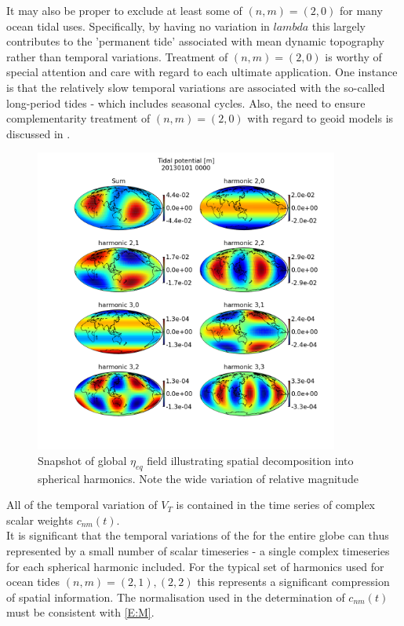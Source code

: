 It may also be proper to exclude at least some of $(n,m) = (2,0)$ for many ocean tidal uses.  Specifically, by having no variation in $lambda$ this largely contributes to the 'permanent tide' associated with mean dynamic topography rather than temporal variations.  Treatment of $(n,m) = (2,0)$ is worthy of special attention and care with regard to each ultimate application.  One instance is that the relatively slow temporal variations are associated with the so-called long-period tides - which includes seasonal cycles.  Also, the need to ensure complementarity treatment of $(n,m) = (2,0)$ with regard to geoid models is discussed in \cite[section 5.3.3.2]{Urban:2013vl}.

\begin{figure}[h]
\begin{center}
\includegraphics[width=100mm]{figures/tidal_potential_spatial_20130101_0000.png}
\caption{Snapshot of global $\eta_{eq}$ field illustrating spatial decomposition into spherical harmonics.  Note the wide variation of relative magnitude}
\label{fig:VT_EG}
\end{center}
\end{figure}


All of the temporal variation of $V_T$ is contained in the time series of complex scalar weights $c_{nm}(t)$.\\
It is significant that the temporal variations of the \ATGP{} for the entire globe can thus represented by a small number of scalar timeseries - a single complex timeseries for each spherical harmonic included.  For the typical set of harmonics used for ocean tides $(n,m)=(2,1),(2,2)$ this represents a significant compression of spatial information.  The normalisation used in the determination of $c_{nm}(t)$ must be consistent with \ref{E:M}.\\


